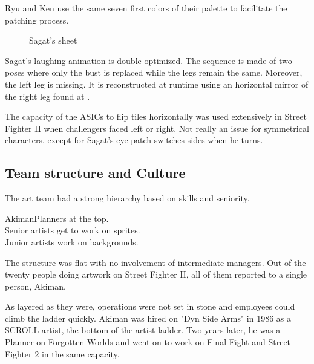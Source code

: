 Ryu and Ken use the same seven first colors of their palette to facilitate the patching process. 






 \begin{figure}[H]
\caption*{Sagat's sheet}
\end{figure}

Sagat's laughing animation is double optimized. The sequence is made of two poses where only the bust is replaced while the legs remain the same. Moreover, the left leg is missing. It is reconstructed at runtime using an horizontal mirror of the right leg found at .

\begin{trivia}
The capacity of the ASICs to flip tiles horizontally was used extensively in Street Fighter II when challengers faced left or right. Not really an issue for symmetrical characters, except for Sagat's eye patch switches sides when he turns.
\end{trivia}

\pagebreak

\subsection{Team structure and Culture}

The art team had a strong hierarchy based on skills and seniority.

\begin{q}{Akiman\cite{akiman2003}}Planners at the top.\\
Senior artists get to work on sprites. \\
Junior artists work on backgrounds.
\end{q}

The structure was flat with no involvement of intermediate managers. Out of the twenty people doing artwork on Street Fighter II, all of them reported to a single person, Akiman\cite{sf2_oral_history}.




As layered as they were, operations were not set in stone and employees could climb the ladder quickly. Akiman was hired on "Dyn Side Arms" in 1986 as a SCROLL artist, the bottom of the artist ladder. Two years later, he was a Planner on Forgotten Worlds and went on to work on Final Fight and Street Fighter 2 in the same capacity.

